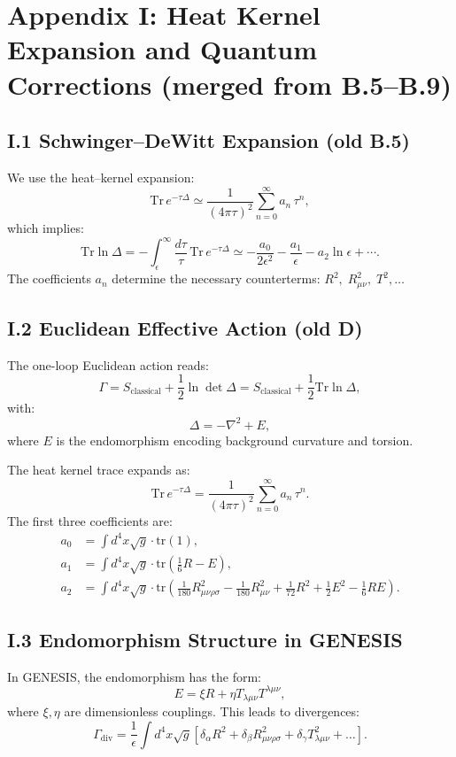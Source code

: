 \documentclass{article}
\newcommand{\Tr}{\mathrm{Tr}}
\begin{document}
\section*{Appendix I: Heat Kernel Expansion and Quantum Corrections (merged from B.5–B.9)}
\label{app:heat-kernel-merged}

\subsection*{I.1 Schwinger–DeWitt Expansion (old B.5)}
We use the heat–kernel expansion:
\[
  \Tr\,e^{-\tau\Delta}
  \simeq \frac{1}{(4\pi\tau)^2}
    \sum_{n=0}^\infty a_n\,\tau^n,
\]
which implies:
\[
  \Tr\ln\Delta
  = -\int_\epsilon^\infty\frac{d\tau}{\tau}\,
    \Tr\,e^{-\tau\Delta}
  \simeq -\frac{a_0}{2\epsilon^2}
    -\frac{a_1}{\epsilon}
    -a_2\ln\epsilon + \cdots.
\]
The coefficients \(a_n\) determine the necessary counterterms: \(R^2,\;R_{\mu\nu}^2,\;T^2,\dots\)

\subsection*{I.2 Euclidean Effective Action (old D)}
The one-loop Euclidean action reads:
\[
\Gamma = S_{\text{classical}} + \frac{1}{2} \ln \det \Delta = S_{\text{classical}} + \frac{1}{2} \text{Tr} \ln \Delta,
\]
with:
\[
\Delta = -\nabla^2 + E,
\]
where \(E\) is the endomorphism encoding background curvature and torsion.

The heat kernel trace expands as:
\[
\text{Tr} \, e^{-\tau \Delta} = \frac{1}{(4\pi \tau)^2} \sum_{n=0}^\infty a_n \, \tau^n.
\]
The first three coefficients are:
\[
\begin{aligned}
a_0 &= \int d^4x \sqrt{g} \cdot \text{tr}(1), \\
a_1 &= \int d^4x \sqrt{g} \cdot \text{tr}\left( \frac{1}{6} R - E \right), \\
a_2 &= \int d^4x \sqrt{g} \cdot \text{tr}\left( \frac{1}{180} R_{\mu\nu\rho\sigma}^2 - \frac{1}{180} R_{\mu\nu}^2 + \frac{1}{72} R^2 + \frac{1}{2} E^2 - \frac{1}{6} R E \right).
\end{aligned}
\]

\subsection*{I.3 Endomorphism Structure in GENESIS}
In GENESIS, the endomorphism has the form:
\[
E = \xi R + \eta T_{\lambda\mu\nu}T^{\lambda\mu\nu},
\]
where \(\xi,\eta\) are dimensionless couplings. This leads to divergences:
\[
\Gamma_{\text{div}} = \frac{1}{\epsilon} \int d^4x \sqrt{g} \left[ \delta_\alpha R^2 + \delta_\beta R_{\mu\nu\rho\sigma}^2 + \delta_\gamma T_{\lambda\mu\nu}^2 + \ldots \right].
\]
\end{document}
